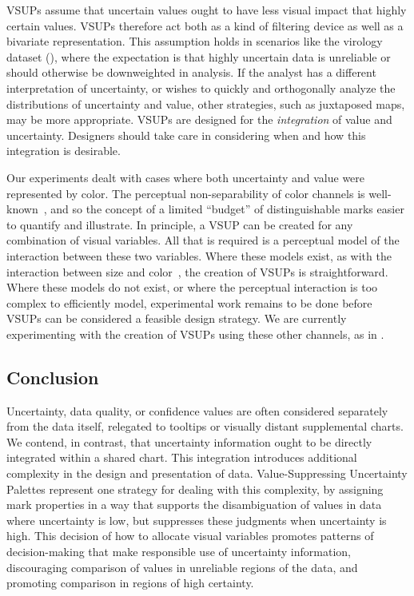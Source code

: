 VSUPs assume that uncertain values ought to have less visual impact that highly certain values. VSUPs therefore act both as a kind of filtering device as well as a bivariate representation. This assumption holds in scenarios like the virology dataset (), where the expectation is that highly uncertain data is unreliable or should otherwise be downweighted in analysis. If the analyst has a different interpretation of uncertainty, or wishes to quickly and orthogonally analyze the distributions of uncertainty and value, other strategies, such as juxtaposed maps, may be more appropriate. VSUPs are designed for the \emph{integration} of value and uncertainty. Designers should take care in considering when and how this integration is desirable.

Our experiments dealt with cases where both uncertainty and value were represented by color. The perceptual non-separability of color channels is well-known~\cite{garner1970integrality, ware2012information}, and so the concept of a limited ``budget'' of distinguishable marks easier to quantify and illustrate. In principle, a VSUP can be created for any combination of visual variables. All that is required is a perceptual model of the interaction between these two variables. Where these models exist, as with the interaction between size and color~\cite{stone2014engineering}, the creation of VSUPs is straightforward. Where these models do not exist, or where the perceptual interaction is too complex to efficiently model, experimental work remains to be done before VSUPs can be considered a feasible design strategy. We are currently experimenting with the creation of VSUPs using these other channels, as in .

\subsection{Conclusion}

Uncertainty, data quality, or confidence values are often considered separately from the data itself, relegated to tooltips or visually distant supplemental charts. We contend, in contrast, that uncertainty information ought to be directly integrated within a shared chart. This integration introduces additional complexity in the design and presentation of data. Value-Suppressing Uncertainty Palettes represent one strategy for dealing with this complexity, by assigning mark properties in a way that supports the disambiguation of values in data where uncertainty is low, but suppresses these judgments when uncertainty is high. This decision of how to allocate visual variables promotes patterns of decision-making that make responsible use of uncertainty information, discouraging comparison of values in unreliable regions of the data, and promoting comparison in regions of high certainty.
